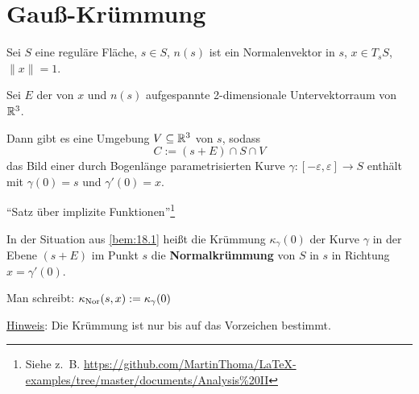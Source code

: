 \section{Gauß-Krümmung}
\begin{bemerkung}\label{bem:18.1}%
    Sei $S$ eine reguläre Fläche, $s \in S$, $n(s)$ ist ein Normalenvektor
    in $s$, $x \in T_s S$, $\|x\| = 1$.

    Sei $E$ der von $x$ und $n(s)$ aufgespannte 2-dimensionale
    Untervektorraum von $\mathbb{R}^3$.

    Dann gibt es eine Umgebung $V \subseteq \mathbb{R}^3$ von $s$, sodass
    \[C := (s + E) \cap S \cap V\]
    das Bild einer durch Bogenlänge parametrisierten Kurve
    $\gamma:[-\varepsilon, \varepsilon] \rightarrow S$ enthält mit
    $\gamma(0) = s$ und $\gamma'(0) = x$.
\end{bemerkung}

\begin{beweis}
    \enquote{Satz über implizite Funktionen}\footnote{Siehe z.~B.
    \url{https://github.com/MartinThoma/LaTeX-examples/tree/master/documents/Analysis\%20II}}
\end{beweis}

\begin{definition}%
    In der Situation aus \cref{bem:18.1} heißt die Krümmung $\kappa_\gamma(0)$
    der Kurve $\gamma$ in der Ebene $(s+ E)$ im Punkt $s$ die
    \textbf{Normalkrümmung} von $S$ in $s$ in Richtung
    $x = \gamma'(0)$.

    Man schreibt: $\kappa_{\textnormal{Nor}}(s, x) := \kappa_\gamma(0)$
\end{definition}

\underline{Hinweis}: Die Krümmung ist nur bis auf das Vorzeichen bestimmt.

